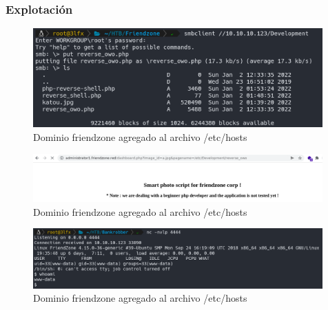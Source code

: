     \subsubsection{Explotación}

    \begin{figure}[H]
        \centering
        \includegraphics[width=0.99\textwidth]{informe4/imagenes/friendzone/17_reverse_shell_upload.png}
        \caption{Dominio friendzone agregado al archivo /etc/hosts} 
    \end{figure}

    \begin{figure}[H]
        \centering
        \includegraphics[width=0.99\textwidth]{informe4/imagenes/friendzone/18_consult.png}
        \caption{Dominio friendzone agregado al archivo /etc/hosts} 
    \end{figure}

    \begin{figure}[H]
        \centering
        \includegraphics[width=0.99\textwidth]{informe4/imagenes/friendzone/19_conexion_wwwdata.png}
        \caption{Dominio friendzone agregado al archivo /etc/hosts} 
    \end{figure}
